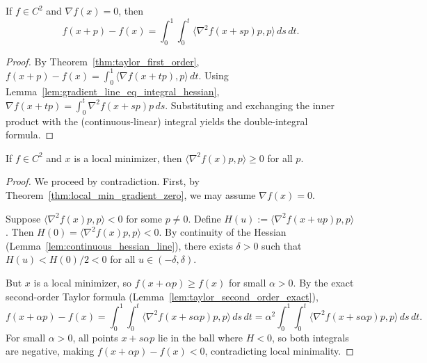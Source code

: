 \begin{lemma}\label{lem:taylor_second_order_exact}
  \leanok{}
  If $f\in C^2$ and $\nabla f(x)=0$, then
  \[
    f(x+p)-f(x)=\int_0^1\int_0^t \langle \nabla^2 f(x+s p)p,p\rangle\,ds\,dt.
  \]
\end{lemma}
\begin{proof}
  \leanok{}
  By Theorem~\ref{thm:taylor_first_order},
  $f(x+p)-f(x) = \int_0^1 \langle \nabla f(x+tp),p\rangle\,dt$.
  Using Lemma~\ref{lem:gradient_line_eq_integral_hessian}, $\nabla f(x+tp) = \int_0^t \nabla^2 f(x+sp)p\,ds$.
  Substituting and exchanging the inner product with the (continuous-linear) integral yields the
  double-integral formula.
\end{proof}

\begin{theorem}\label{thm:local_min_hessian_psd}
  \leanok{}
  If $f\in C^2$ and $x$ is a local minimizer, then $\langle \nabla^2 f(x)p,p\rangle\ge 0$ for all $p$.
\end{theorem}

\begin{proof}
  \leanok{}
  We proceed by contradiction. First, by Theorem~\ref{thm:local_min_gradient_zero}, we may assume $\nabla f(x) = 0$.

  Suppose $\langle \nabla^2 f(x)p,p\rangle<0$ for some $p \neq 0$. Define $H(u):=\langle \nabla^2 f(x+u p)p,p\rangle$.
  Then $H(0) = \langle \nabla^2 f(x)p,p\rangle < 0$. By continuity of the Hessian (Lemma~\ref{lem:continuous_hessian_line}),
  there exists $\delta>0$ such that $H(u) < H(0)/2 < 0$ for all $u \in (-\delta, \delta)$.

  But $x$ is a local minimizer, so $f(x+\alpha p) \ge f(x)$ for small $\alpha > 0$. By the exact second-order Taylor
  formula (Lemma~\ref{lem:taylor_second_order_exact}),
  \[
    f(x+\alpha p) - f(x) = \int_0^1\int_0^t \langle \nabla^2 f(x+s\alpha p)p,p\rangle\,ds\,dt
    = \alpha^2 \int_0^1\int_0^t \langle \nabla^2 f(x+s\alpha p)p,p\rangle\,ds\,dt.
  \]
  For small $\alpha > 0$, all points $x + s\alpha p$ lie in the ball where $H < 0$, so both integrals are negative,
  making $f(x+\alpha p) - f(x) < 0$, contradicting local minimality.
\end{proof}

